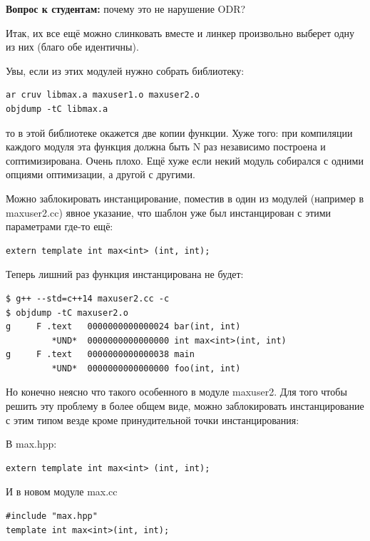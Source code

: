 \documentclass[a4paper,12pt,oneside]{article}
\newif\ifanswers
\begin{document}
\textbf{Вопрос к студентам:} почему это не нарушение ODR?

\ifanswers
Верный ответ: в ODR для шаблонных функций слово one означает один на модуль
\fi

Итак, их все ещё можно слинковать вместе и линкер произвольно выберет одну из них (благо обе идентичны).

Увы, если из этих модулей нужно собрать библиотеку:

\begin{verbatim}
ar cruv libmax.a maxuser1.o maxuser2.o
objdump -tC libmax.a
\end{verbatim}

то в этой библиотеке окажется две копии функции. Хуже того: при компиляции каждого модуля эта функция должна быть N раз независимо построена и соптимизирована. Очень плохо. Ещё хуже если некий модуль собирался с одними опциями оптимизации, а другой с другими.

Можно заблокировать инстанцирование, поместив в один из модулей (например в maxuser2.cc) явное указание, что шаблон уже был инстанцирован с этими параметрами где-то ещё:

\begin{lstlisting}
extern template int max<int> (int, int);
\end{lstlisting}

Теперь лишний раз функция инстанцирована не будет:

\begin{verbatim}
$ g++ --std=c++14 maxuser2.cc -c
$ objdump -tC maxuser2.o
g     F .text	0000000000000024 bar(int, int)
         *UND*	0000000000000000 int max<int>(int, int)
g     F .text	0000000000000038 main
         *UND*	0000000000000000 foo(int, int)
\end{verbatim}

Но конечно неясно что такого особенного в модуле maxuser2. Для того чтобы решить эту проблему в более общем виде, можно заблокировать инстанцирование с этим типом везде кроме принудительной точки инстанцирования:

В max.hpp:

\begin{lstlisting}
extern template int max<int> (int, int);
\end{lstlisting}

И в новом модуле max.cc

\begin{lstlisting}
#include "max.hpp"
template int max<int>(int, int);
\end{lstlisting}
\end{document}
